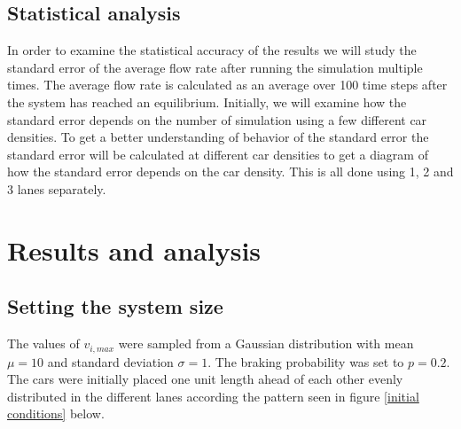 \documentclass[a4paper,12pt]{article}
\begin{document}
\subsection*{Statistical analysis}
In order to examine the statistical accuracy of the results we will study the standard error of the average flow rate after running the simulation multiple times. 
The average flow rate is calculated as an average over 100 time steps after the system has reached an equilibrium. Initially, we will examine how the standard error
depends on the number of simulation using a few different car densities. To get a better understanding of behavior of the standard error the standard error will be calculated
at different car densities to get a diagram of how the standard error depends on the car density. This is all done using 1, 2 and 3 lanes separately.



\section*{Results and analysis}
\subsection*{Setting the system size}
The values of $v_{i,max}$ were sampled from a Gaussian distribution with mean $\mu = 10$ and standard deviation $\sigma = 1$. The braking probability
was set to $p=0.2$. The cars were initially placed one unit length ahead of each other evenly distributed in the different lanes according the 
pattern seen in figure \ref*{initial conditions} below.
\end{document}

